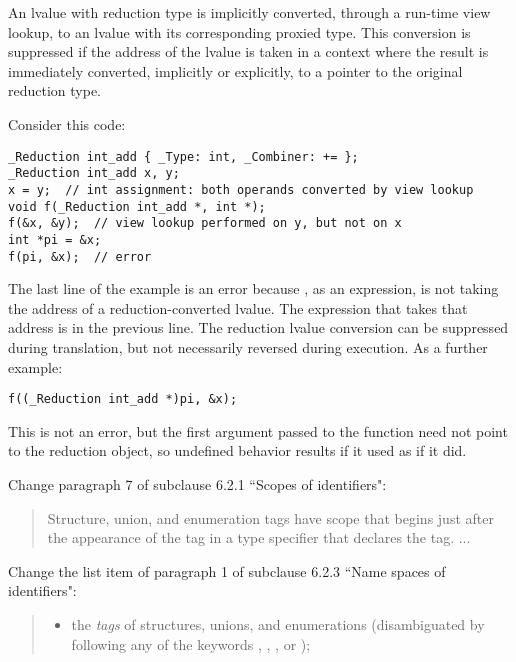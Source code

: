 An lvalue with reduction type is implicitly converted,
through a run-time view lookup,
to an lvalue with its corresponding proxied type.
This conversion is suppressed
if the address of the lvalue is taken in a context
where the result is immediately converted,
implicitly or explicitly,
to a pointer to the original reduction type.

\begin{example}
Consider this code:

\begin{verbatim}
_Reduction int_add { _Type: int, _Combiner: += };
_Reduction int_add x, y;
x = y;	// int assignment: both operands converted by view lookup
void f(_Reduction int_add *, int *);
f(&x, &y);  // view lookup performed on y, but not on x
int *pi = &x;
f(pi, &x);  // error
\end{verbatim}

The last line of the example is an error because
,
as an expression,
is not taking the address of a reduction-converted lvalue.
The expression that takes that address is in the previous line.
The reduction lvalue conversion can be suppressed during translation,
but not necessarily reversed during execution.
As a further example:

\begin{verbatim}
f((_Reduction int_add *)pi, &x);
\end{verbatim}

This is not an error,
but the first argument passed to the function
need not point to the reduction object,
so undefined behavior results if it used as if it did.
\end{example}


Change paragraph 7 of subclause 6.2.1 ``Scopes of identifiers":

\begin{quote}
Structure, union,
and enumeration tags have scope that begins
just after the appearance of the tag
in a type specifier that declares the tag. ...
\end{quote}

Change the list item of paragraph 1
of subclause 6.2.3 ``Name spaces of identifiers":

\begin{quote}
\begin{itemize}
\item
the
\textit{tags}
of structures, unions,
and enumerations
(disambiguated by following any of the keywords
,
,
,
or
);
\end{itemize}
\end{quote}

